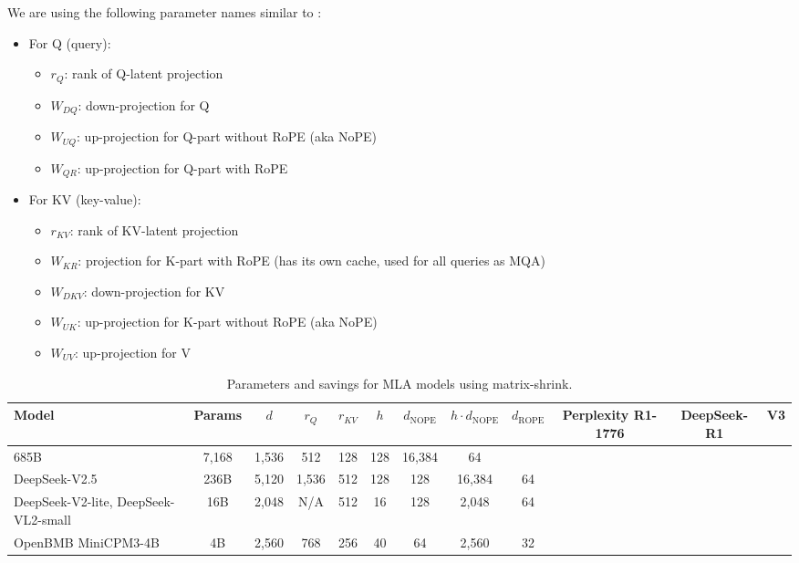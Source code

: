 \documentclass{article}
\begin{document}
We are using the following parameter names similar to \cite{deepseek2024}:

\begin{itemize}
\item For Q (query): 
  \begin{itemize}
    \item $r_Q$: rank of Q-latent projection
    \item $W_{DQ}$: down-projection for Q
    \item $W_{UQ}$: up-projection for Q-part without RoPE (aka NoPE)
    \item $W_{QR}$: up-projection for Q-part with RoPE
  \end{itemize}
\item For KV (key-value): 
  \begin{itemize}
    \item $r_{KV}$: rank of KV-latent projection
    \item $W_{KR}$: projection for K-part with RoPE (has its own cache, used for all queries as MQA)
    \item $W_{DKV}$: down-projection for KV
    \item $W_{UK}$: up-projection for K-part without RoPE (aka NoPE)
    \item $W_{UV}$: up-projection for V
  \end{itemize}
\end{itemize}

\begin{table}[h]
\centering
\begin{tabular}{lccccccccccc}
\toprule
Model & Params & $d$ & $r_Q$ & $r_{KV}$ & $h$ & $d_{\text{NOPE}}$ & $h \cdot d_{\text{NOPE}}$ & $d_{\text{ROPE}}$ & Perplexity R1-1776 & DeepSeek-R1 & V3 \\
\midrule
685B & 7,168 & 1,536 & 512 & 128 & 128 & 16,384 & 64 & & & & \\
DeepSeek-V2.5 & 236B & 5,120 & 1,536 & 512 & 128 & 128 & 16,384 & 64 & & & \\
DeepSeek-V2-lite, DeepSeek-VL2-small & 16B & 2,048 & N/A & 512 & 16 & 128 & 2,048 & 64 & & & \\
OpenBMB MiniCPM3-4B & 4B & 2,560 & 768 & 256 & 40 & 64 & 2,560 & 32 & & & \\
\bottomrule
\end{tabular}
\caption{Parameters and savings for MLA models using matrix-shrink.}
\label{tab:tab2}
\end{table}
\end{document}
